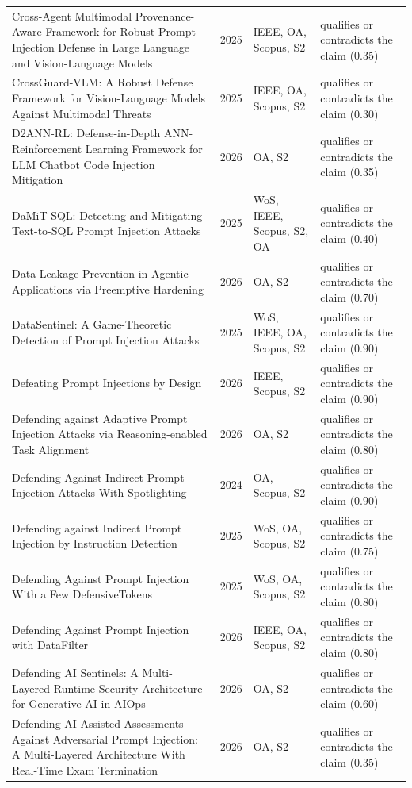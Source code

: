 \begin{longtable}{@{}%
  >{\raggedright\arraybackslash}p{}c%
  >{\raggedright\arraybackslash}p{}%
  >{\raggedright\arraybackslash}p{}@{}}
Cross-Agent Multimodal Provenance-Aware Framework for Robust Prompt Injection Defense in Large Language and Vision-Language Models & 2025 & IEEE, OA, Scopus, S2 & qualifies or contradicts the claim (0.35) \\
CrossGuard-VLM: A Robust Defense Framework for Vision-Language Models Against Multimodal Threats & 2025 & IEEE, OA, Scopus, S2 & qualifies or contradicts the claim (0.30) \\
D2ANN-RL: Defense-in-Depth ANN-Reinforcement Learning Framework for LLM Chatbot Code Injection Mitigation & 2026 & OA, S2 & qualifies or contradicts the claim (0.35) \\
DaMiT-SQL: Detecting and Mitigating Text-to-SQL Prompt Injection Attacks & 2025 & WoS, IEEE, Scopus, S2, OA & qualifies or contradicts the claim (0.40) \\
Data Leakage Prevention in Agentic Applications via Preemptive Hardening & 2026 & OA, S2 & qualifies or contradicts the claim (0.70) \\
DataSentinel: A Game-Theoretic Detection of Prompt Injection Attacks & 2025 & WoS, IEEE, OA, Scopus, S2 & qualifies or contradicts the claim (0.90) \\
Defeating Prompt Injections by Design & 2026 & IEEE, Scopus, S2 & qualifies or contradicts the claim (0.90) \\
Defending against Adaptive Prompt Injection Attacks via Reasoning-enabled Task Alignment & 2026 & OA, S2 & qualifies or contradicts the claim (0.80) \\
Defending Against Indirect Prompt Injection Attacks With Spotlighting & 2024 & OA, Scopus, S2 & qualifies or contradicts the claim (0.90) \\
Defending against Indirect Prompt Injection by Instruction Detection & 2025 & WoS, OA, Scopus, S2 & qualifies or contradicts the claim (0.75) \\
Defending Against Prompt Injection With a Few DefensiveTokens & 2025 & WoS, OA, Scopus, S2 & qualifies or contradicts the claim (0.80) \\
Defending Against Prompt Injection with DataFilter & 2026 & IEEE, OA, Scopus, S2 & qualifies or contradicts the claim (0.80) \\
Defending AI Sentinels: A Multi-Layered Runtime Security Architecture for Generative AI in AIOps & 2026 & OA, S2 & qualifies or contradicts the claim (0.60) \\
Defending AI-Assisted Assessments Against Adversarial Prompt Injection: A Multi-Layered Architecture With Real-Time Exam Termination & 2026 & OA, S2 & qualifies or contradicts the claim (0.35) \\

\end{longtable}

